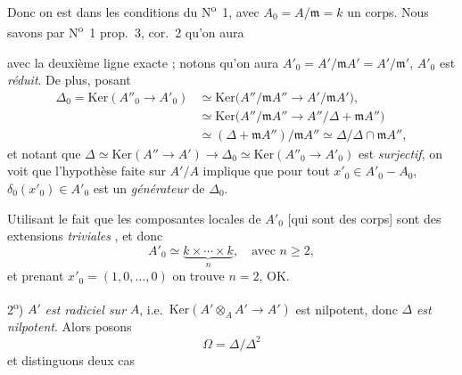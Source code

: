 \documentclass[11pt,a4paper]{article}
\begin{document}

Donc on est dans les conditions du N\textsuperscript{o}~1, avec
$A_0 = A/\mathfrak{m} = k$ un corps.  Nous savons par
N\textsuperscript{o}~1 prop.~3, cor.~2 qu'on aura


\marginal{\ill{} \ill{} \ill{}}

avec la deuxième ligne exacte ; notons qu'on aura
$A'_0 = A'/\mathfrak{m}A' = A'/\mathfrak{m}'$, $A'_0$ est \emph{réduit}.
De plus, posant
\[
  \begin{aligned}
  \Delta_0 = \mathrm{Ker}(A''_0 \to A'_0)
  &\simeq \mathrm{Ker}\bigl(A''/\mathfrak{m}A'' \to A'/\mathfrak{m}A'\bigr) , \\
  &\simeq \mathrm{Ker}\bigl(A''/\mathfrak{m}A'' \to A''/\Delta + \mathfrak{m}A''\bigr) \\
  &\simeq (\Delta + \mathfrak{m}A'')/\mathfrak{m}A''
  \simeq \Delta/\Delta \cap \mathfrak{m}A'' ,
  \end{aligned}
\]
et notant que
$\Delta \simeq \mathrm{Ker}(A'' \to A') \to \Delta_0 \simeq
\mathrm{Ker}(A''_0 \to A'_0)$ est \emph{surjectif}, on voit que
\struck{$\Delta$} l'hypothèse faite sur $A'/A$ implique que pour tout
$x'_0 \in A'_0 - A_0$,  $\delta_0(x'_0) \in A'_0$ est un
\emph{générateur} de $\Delta_0$.

Utilisant le fait que les composantes locales de $A'_0$ 
[qui sont des corps] sont des extensions \emph{triviales} , et donc
\[
  A'_0 \simeq \underbrace{k \times \cdots \times k}_{n} , \quad
  \text{avec } n \geqslant 2 ,
\]
et prenant $x'_0 = (1, 0, \ldots, 0)$ on trouve $n = 2$, OK.


2\textsuperscript{o}) $A'$ \emph{est radiciel sur} $A$, i.e.\
$\mathrm{Ker}(A' \otimes_A A' \to A')$ est nilpotent, donc $\Delta$
\emph{est nilpotent}. Alors posons
\[
  \Omega = \Delta/\Delta^2
\]
et distinguons deux cas
\end{document}
